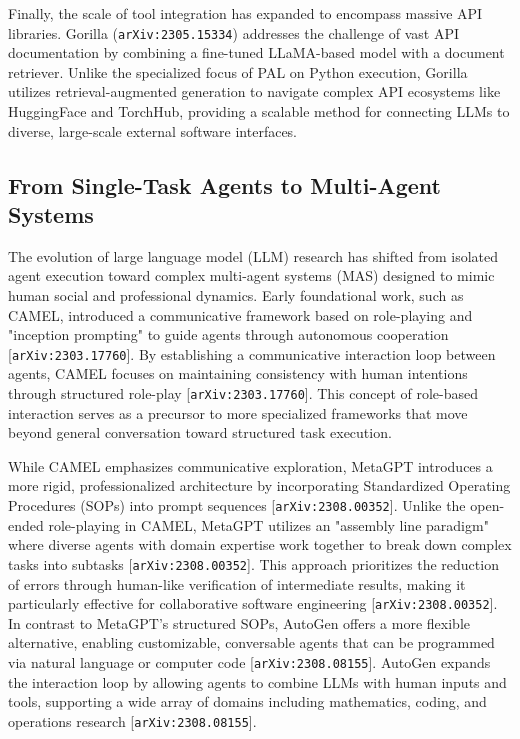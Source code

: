 \documentclass[11pt]{article}
\begin{document}
Finally, the scale of tool integration has expanded to encompass massive API libraries. Gorilla (\texttt{arXiv:2305.15334}) addresses the challenge of vast API documentation by combining a fine-tuned LLaMA-based model with a document retriever. Unlike the specialized focus of PAL on Python execution, Gorilla utilizes retrieval-augmented generation to navigate complex API ecosystems like HuggingFace and TorchHub, providing a scalable method for connecting LLMs to diverse, large-scale external software interfaces.

\subsection{From Single-Task Agents to Multi-Agent Systems}

The evolution of large language model (LLM) research has shifted from isolated agent execution toward complex multi-agent systems (MAS) designed to mimic human social and professional dynamics. Early foundational work, such as CAMEL, introduced a communicative framework based on role-playing and "inception prompting" to guide agents through autonomous cooperation [\texttt{arXiv:2303.17760}]. By establishing a communicative interaction loop between agents, CAMEL focuses on maintaining consistency with human intentions through structured role-play [\texttt{arXiv:2303.17760}]. This concept of role-based interaction serves as a precursor to more specialized frameworks that move beyond general conversation toward structured task execution.

While CAMEL emphasizes communicative exploration, MetaGPT introduces a more rigid, professionalized architecture by incorporating Standardized Operating Procedures (SOPs) into prompt sequences [\texttt{arXiv:2308.00352}]. Unlike the open-ended role-playing in CAMEL, MetaGPT utilizes an "assembly line paradigm" where diverse agents with domain expertise work together to break down complex tasks into subtasks [\texttt{arXiv:2308.00352}]. This approach prioritizes the reduction of errors through human-like verification of intermediate results, making it particularly effective for collaborative software engineering [\texttt{arXiv:2308.00352}]. In contrast to MetaGPT's structured SOPs, AutoGen offers a more flexible alternative, enabling customizable, conversable agents that can be programmed via natural language or computer code [\texttt{arXiv:2308.08155}]. AutoGen expands the interaction loop by allowing agents to combine LLMs with human inputs and tools, supporting a wide array of domains including mathematics, coding, and operations research [\texttt{arXiv:2308.08155}].
\end{document}
